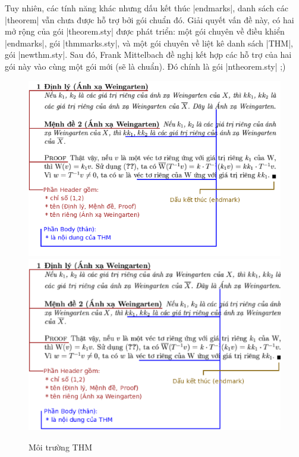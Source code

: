 \medskip
Tuy nhiên, các tính năng khác nhưng dấu kết thúc |endmarks|, danh sách
các |theorem| vẫn chưa được hỗ trợ bởi gói chuẩn đó. Giải quyết vấn đề này,
có hai mở rộng của gói |theorem.sty| được phát triển: một gói chuyên về
điều khiển |endmarks|, gói |thmmarks.sty|, và một gói chuyên về liệt
kê danh sách |THM|, gói |newthm.sty|. Sau đó, Frank Mittelbach đề nghị
kết hợp các hỗ trợ của hai gói này vào cùng một gói mới (sẽ là chuẩn).
Đó chính là gói |ntheorem.sty| ;)

\begin{figure}[bht]
\begin{center}
	\ifpdf
		\includegraphics[scale=.6]{thm.png}
	\else
		\includegraphics[scale=.6]{thm.ps}
	\fi
\end{center}
\caption{Môi trường THM}
\label{fig:THM}
\end{figure}

\endinput

